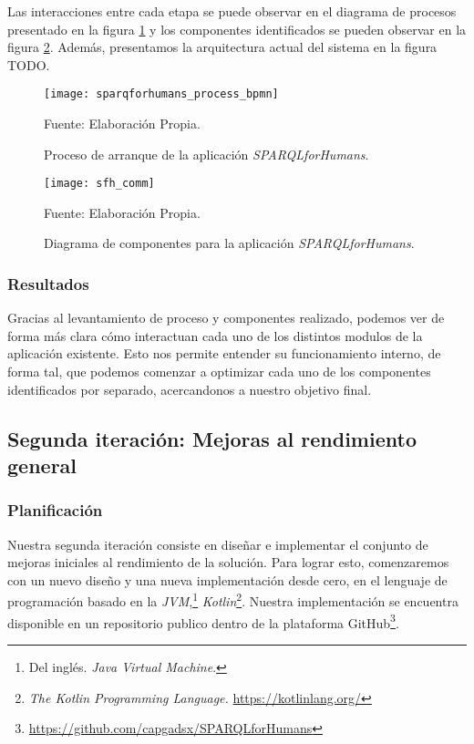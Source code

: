 Las interacciones entre cada etapa se puede observar en el diagrama de procesos presentado en la figura \ref{fig:sfh-bpmn} y los componentes identificados se pueden observar en la figura \ref{fig:sfh-componentes}. Además, presentamos la arquitectura actual del sistema en la figura TODO.

\begin{figure}[ht]
    \centering
    \texttt{[image: sparqforhumans\_process\_bpmn]}
    \caption{Proceso de arranque de la aplicación \textit{SPARQLforHumans}.}Fuente: Elaboración Propia.
    \label{fig:sfh-bpmn}
\end{figure}

\begin{figure}
    \centering
    \texttt{[image: sfh\_comm]}
    \caption{Diagrama de componentes para la aplicación \textit{SPARQLforHumans}.}Fuente: Elaboración Propia.
    \label{fig:sfh-componentes}
\end{figure}

\subsubsection*{Resultados}

Gracias al levantamiento de proceso y componentes realizado, podemos ver de forma más clara cómo interactuan cada uno de los distintos modulos de la aplicación existente. Esto nos permite entender su funcionamiento interno, de forma tal, que podemos comenzar a optimizar cada uno de los componentes identificados por separado, acercandonos a nuestro objetivo final.

\subsection{Segunda iteración: Mejoras al rendimiento general}

\subsubsection*{Planificación}

Nuestra segunda iteración consiste en diseñar e implementar el conjunto de mejoras iniciales al rendimiento de la solución. Para lograr esto, comenzaremos con un nuevo diseño y una nueva implementación desde cero, en el lenguaje de programación basado en la \textit{JVM},\footnote{Del inglés. \textit{Java Virtual Machine}.} \textit{Kotlin}\footnote{\textit{The Kotlin Programming Language.} \href{https://kotlinlang.org/}{https://kotlinlang.org/}}. Nuestra implementación se encuentra disponible en un repositorio publico dentro de la plataforma GitHub\footnote{\href{https://github.com/capgadsx/SPARQLforHumans}{https://github.com/capgadsx/SPARQLforHumans}}.

